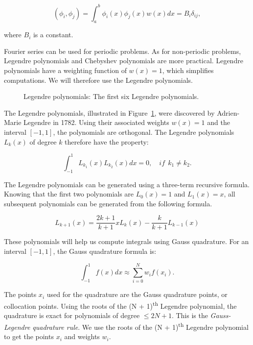 \begin{equation}
    \left( \phi_i, \phi_j \right) = \int_a^b \phi_i(x) \phi_j(x) w(x) dx = B_{i} \delta_{i j},
\end{equation}

\noindent
where \(B_i\) is a constant.

Fourier series can be used for periodic problems. As for non-periodic problems, Legendre polynomials
and Chebyshev polynomials are more practical. Legendre polynomials have a weighting function of
\(w(x) = 1\), which simplifies computations. We will therefore use the Legendre polynomials.

\begin{figure}[H]
    \centering
    
    \caption{Legendre polynomials: The first six Legendre polynomials.}\label{fig:polynomials}
\end{figure}

The Legendre polynomials, illustrated in Figure~\ref{fig:polynomials}, were discovered by
Adrien-Marie Legendre in 1782. Using their associated weights \(w(x) = 1\) and the interval \(\left[
-1, 1 \right]\), the polynomials are orthogonal. The Legendre polynomials \(L_k \left( x \right)\)
of degree \(k\) therefore have the property:

\begin{equation}
    \int_{-1}^{1}L_{k_1}(x) L_{k_2}(x) dx = 0, \quad if \: \: k_1 \neq k_2.
\end{equation}

The Legendre polynomials can be generated using a three-term recursive formula. Knowing that the
first two polynomials are \(L_0 \left( x \right) = 1\) and \(L_1 \left( x \right) = x\), all
subsequent polynomials can be generated from the following formula.

\begin{equation} \label{equ:three_terms}
    L_{k + 1}(x) = \frac{2k + 1}{k + 1}xL_k(x) - \frac{k}{k + 1}L_{k - 1}(x)
\end{equation}

These polynomials will help us compute integrals using Gauss quadrature. For an interval \(\left[
-1, 1 \right]\), the Gauss quadrature formula is:

\begin{equation}
    \int_{-1}^{1}f(x)dx \approx \sum_{i = 0}^{N}w_i f(x_i).
\end{equation}

The points \(x_i\) used for the quadrature are the Gauss quadrature points, or collocation points.
Using the roots of the (N + 1)\textsuperscript{th} Legendre polynomial, the quadrature is exact for
polynomials of degree \(\leq 2 N + 1\). This is the \textit{Gauss-Legendre quadrature rule}. We use
the roots of the (N + 1)\textsuperscript{th} Legendre polynomial to get the points \(x_i\) and
weights \(w_i\).

